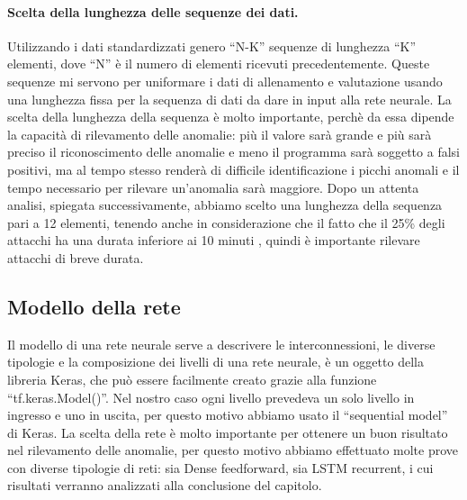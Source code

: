 \paragraph{Scelta della lunghezza delle sequenze dei dati.} Utilizzando i dati standardizzati genero ``N-K'' sequenze di lunghezza ``K'' elementi, dove ``N'' è il numero di elementi ricevuti precedentemente. Queste sequenze mi servono per uniformare i dati di allenamento e valutazione usando una lunghezza fissa per la sequenza di dati da dare in input alla rete neurale.
La scelta della lunghezza della sequenza è molto importante, perchè da essa dipende la capacità di rilevamento delle anomalie: più il valore sarà grande e più sarà preciso il riconoscimento delle anomalie e meno il programma sarà soggetto a falsi positivi, ma al tempo stesso renderà di difficile identificazione i picchi anomali e il tempo necessario per rilevare un'anomalia sarà maggiore.
Dopo un attenta analisi, spiegata successivamente, abbiamo scelto una lunghezza della sequenza pari a 12 elementi, tenendo anche in considerazione che il fatto che il 25\% degli attacchi ha una durata inferiore ai 10 minuti \cite{imperva_ddos_report}, quindi è importante rilevare attacchi di breve durata.


\subsection{Modello della rete}


Il modello di una rete neurale serve a descrivere le interconnessioni, le diverse tipologie e la composizione dei livelli di una rete neurale, è un oggetto della libreria Keras, che può essere facilmente creato grazie alla funzione ``tf.keras.Model()''.
Nel nostro caso ogni livello prevedeva un solo livello in ingresso e uno in uscita, per questo motivo abbiamo usato il ``sequential model'' di Keras.
La scelta della rete è molto importante per ottenere un buon risultato nel rilevamento delle anomalie, per questo motivo abbiamo effettuato molte prove con diverse tipologie di reti: sia Dense feedforward, sia LSTM recurrent, i cui risultati verranno analizzati alla conclusione del capitolo.


